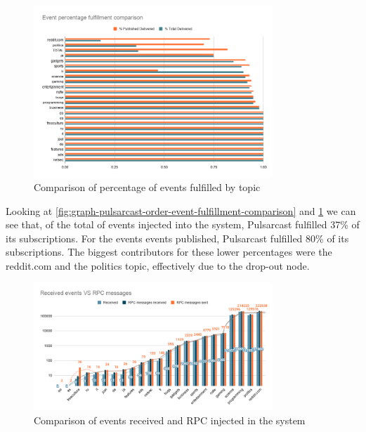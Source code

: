 \begin{figure}[!htb]
  \centering
  \includegraphics[width=0.8\textwidth]{img/graph-pulsarcast-order-event-percentage-fulfillment-comparison.png}
  \caption{Comparison of percentage of events fulfilled by topic}
  \label{fig:graph-pulsarcast-order-event-percentage-fulfillment-comparison}
\end{figure}

Looking at \ref{fig:graph-pulsarcast-order-event-fulfillment-comparison} and
\ref{fig:graph-pulsarcast-order-event-percentage-fulfillment-comparison} we can
see that, of the total of events injected into the system, Pulsarcast fulfilled 37\% of
its subscriptions. For the events events published, Pulsarcast fulfilled 80\%
of its subscriptions. The biggest contributors for these lower percentages were
the reddit.com and the politics topic, effectively due to the drop-out node.

\begin{figure}[!htb]
  \centering
  \includegraphics[width=0.8\textwidth]{img/graph-pulsarcast-order-rpc.png}
  \caption{Comparison of events received and RPC injected in the system}
  \label{fig:graph-pulsarcast-order-rpc}
\end{figure}

